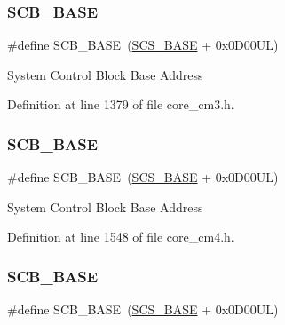 \subsubsection{\texorpdfstring{S\+C\+B\+\_\+\+B\+A\+SE}{SCB\_BASE}\hspace{0.1cm}{\footnotesize\ttfamily [5/7]}}
{\footnotesize\ttfamily \#define S\+C\+B\+\_\+\+B\+A\+SE~(\hyperlink{group___c_m_s_i_s__core__base_ga3c14ed93192c8d9143322bbf77ebf770}{S\+C\+S\+\_\+\+B\+A\+SE} +  0x0\+D00\+U\+L)}

System Control Block Base Address 

Definition at line 1379 of file core\+\_\+cm3.\+h.

\mbox{\label{group___c_m_s_i_s__core__base_gad55a7ddb8d4b2398b0c1cfec76c0d9fd}} 
\subsubsection{\texorpdfstring{S\+C\+B\+\_\+\+B\+A\+SE}{SCB\_BASE}\hspace{0.1cm}{\footnotesize\ttfamily [6/7]}}
{\footnotesize\ttfamily \#define S\+C\+B\+\_\+\+B\+A\+SE~(\hyperlink{group___c_m_s_i_s__core__base_ga3c14ed93192c8d9143322bbf77ebf770}{S\+C\+S\+\_\+\+B\+A\+SE} +  0x0\+D00\+U\+L)}

System Control Block Base Address 

Definition at line 1548 of file core\+\_\+cm4.\+h.

\mbox{\label{group___c_m_s_i_s__core__base_gad55a7ddb8d4b2398b0c1cfec76c0d9fd}} 
\subsubsection{\texorpdfstring{S\+C\+B\+\_\+\+B\+A\+SE}{SCB\_BASE}\hspace{0.1cm}{\footnotesize\ttfamily [7/7]}}
{\footnotesize\ttfamily \#define S\+C\+B\+\_\+\+B\+A\+SE~(\hyperlink{group___c_m_s_i_s__core__base_ga3c14ed93192c8d9143322bbf77ebf770}{S\+C\+S\+\_\+\+B\+A\+SE} +  0x0\+D00\+U\+L)}

